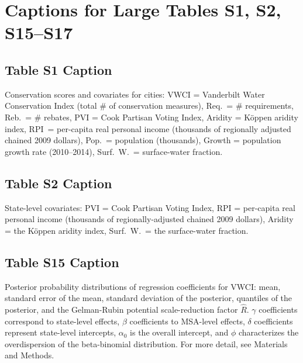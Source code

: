 \documentclass[draft]{agujournal}\usepackage{knitr}
\begin{document}
%
%
\iffalse
%
\section*{Captions for Large Tables S1, S2, S15--S17}
\subsection*{Table S1 Caption}
\setcounter{table}{0}%
\begin{table}[H]
\centering
\caption{Conservation scores and covariates for  cities: VWCI = Vanderbilt Water Conservation Index (total \# of conservation measures), Req.\ = \# requirements, Reb.\ = \# rebates, PVI = Cook Partisan Voting Index, Aridity = K\"oppen aridity index, RPI\ = per-capita real personal income (thousands of regionally adjusted chained 2009 dollars), Pop.\ = population (thousands), Growth = population growth rate (2010--2014), Surf.\ W.\ = surface-water fraction.}
\end{table}


\subsection*{Table S2 Caption}
\setcounter{table}{1}%
\begin{table}[H]
\centering
\caption{State-level covariates: PVI = Cook Partisan Voting Index, RPI = per-capita real personal income (thousands of regionally-adjusted chained 2009 dollars), Aridity = the K\"oppen aridity index, Surf.\ W.\ = the surface-water fraction.}
\end{table}


\subsection*{Table S15 Caption}
\setcounter{table}{14}%
\begin{table}[H]
\centering
\caption{Posterior probability distributions of regression coefficients for VWCI: mean, standard error of the mean, standard deviation of the posterior, quantiles of the posterior, and the Gelman-Rubin potential scale-reduction factor $\hat R$. $\gamma$ coefficients correspond to state-level effects, $\beta$ coefficients to MSA-level effects, $\delta$ coefficients represent state-level intercepts, $\alpha_0$ is the overall intercept, and $\phi$ characterizes the overdispersion of the beta-binomial distribution. For more detail, see Materials and Methods.}
\end{table}
\end{document}
